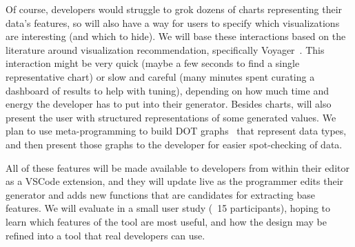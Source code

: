 Of course, developers would struggle to grok dozens of charts representing
their data's features, so \genvis{} will also have a way for users to specify
which visualizations are interesting (and which to hide). We will base these
interactions based on the literature around visualization recommendation,
specifically Voyager~\cite{wongsuphasawat_voyager_2016,
wongsuphasawat_voyager_2017}. This interaction might be very quick (maybe a few
seconds to find a single representative chart) or slow and careful (many minutes
spent curating a dashboard of results to help with tuning), depending on how
much time and energy the developer has to put into their generator. Besides
charts, \genvis{} will also present the user with structured representations of
some generated values. We plan to use meta-programming to build
DOT graphs~\cite{ellson_graphviz_2002} that represent data types, and then
present those graphs to the developer for easier spot-checking of data.

All of these features will be made available to developers from within their
editor as a VSCode extension, and they will update live as the programmer edits
their generator and adds new functions that are candidates for extracting base
features. We will evaluate \genvis{} in a small user study (~15 participants),
hoping to learn which features of the tool are most useful, and how the design
may be refined into a tool that real developers can use. 



